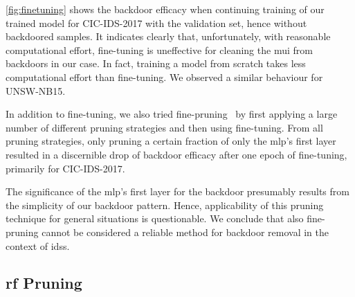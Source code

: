 \documentclass[9pt,sigconf,letterpaper,dvipsnames\ifx\removeHeaders\tempYes ,nonacm\fi]{acmart}
\newcommand\note[2]{{\color{#1}#2}}
\newcommand\todo[1]{{\note{red}{TODO: #1}}}
\newcommand{\unsw}{UNSW-NB15}
\newcommand{\cic}{CIC-IDS-2017}
\begin{document}
\autoref{fig:finetuning} shows the backdoor efficacy when continuing training of our trained model for \cic{} with the validation set, hence without backdoored samples.
It indicates clearly that, unfortunately, with reasonable computational effort, fine-tuning is uneffective for cleaning the \gls{mui} from backdoors in our case. In fact, training a model from scratch takes less computational effort than fine-tuning. We observed a similar behaviour for \unsw{}.

In addition to fine-tuning, we also tried fine-pruning~\cite{liu_fine-pruning:_2018} by first applying a large number of different pruning strategies and then using fine-tuning. From all pruning strategies, only pruning a certain fraction of only the \gls{mlp}'s first layer resulted in a discernible drop of backdoor efficacy after one epoch of fine-tuning, primarily for \cic{}.

The significance of the \gls{mlp}'s first layer for the backdoor presumably results from the simplicity of our backdoor pattern. Hence, applicability of this pruning technique for general situations is questionable. We conclude that also fine-pruning cannot be considered a reliable method for backdoor removal in the context of \glspl{ids}.


\subsection{\gls{rf} Pruning}
\end{document}
